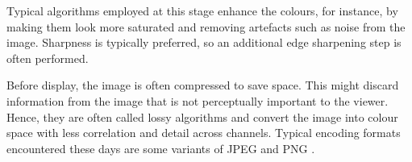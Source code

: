 Typical algorithms employed at this stage enhance the colours, for instance, by making them look more saturated and removing artefacts such as noise from the image. Sharpness is typically preferred, so an additional edge sharpening step is often performed.  \cite[40-41]{Ramanath} \cite{4050037}

Before display, the image is often compressed to save space. This might discard information from the image that is not perceptually important to the viewer. Hence, they are often called lossy algorithms and convert the image into colour space with less correlation and detail across channels. Typical encoding formats encountered these days are some variants of JPEG \cite{JPEG} and PNG \cite{PNG}.